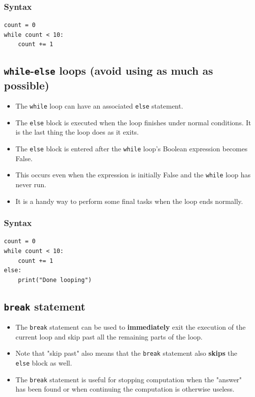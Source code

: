 \documentclass[11pt]{article}
\begin{document}
\subsubsection{Syntax}
\label{sec:org7c5c14c}
\begin{verbatim}
count = 0
while count < 10:
    count += 1
\end{verbatim}

\subsection{\texttt{while}-\texttt{else} loops (avoid using as much as possible)}
\label{sec:org917a593}
\begin{itemize}
\item The \texttt{while} loop can have an associated \texttt{else} statement.
\item The \texttt{else} block is executed when the loop finishes under normal conditions. It is the last thing the loop does as it exits.
\item The \texttt{else} block is entered after the \texttt{while} loop's Boolean expression becomes False.
\item This occurs even when the expression is initially False and the \texttt{while} loop has never run.
\item It is a handy way to perform some final tasks when the loop ends normally.
\end{itemize}

\subsubsection{Syntax}
\label{sec:orga60df1f}
\begin{verbatim}
count = 0
while count < 10:
    count += 1
else:
    print("Done looping")
\end{verbatim}

\subsection{\texttt{break} statement}
\label{sec:org1f66638}
\begin{itemize}
\item The \texttt{break} statement can be used to \textbf{immediately} exit the execution of the current loop and skip past all the remaining parts of the loop.
\item Note that "skip past" also means that the \texttt{break} statement also \textbf{skips} the \texttt{else} block as well.
\item The \texttt{break} statement is useful for stopping computation when the "answer" has been found or when continuing the computation is otherwise useless.
\end{itemize}
\end{document}
